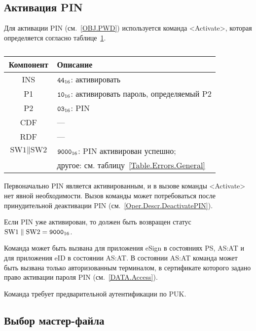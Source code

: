 \subsection{Активация PIN}\label{Oper.Descr.ActivatePIN}

Для активации PIN (см.~\ref{OBJ.PWD})  используется
команда <Activate>, которая определяется согласно 
таблице~\ref{Table.Oper.ActivatePINCmd}.

\begin{table}[hbt]
\caption{}\label{Table.Oper.ActivatePINCmd}
\begin{tabular}{|c|p{14cm}|}
\hline
Компонент & Описание\\
\hline
\hline
INS & $\texttt{44}_{16}$: активировать\\
\hline
P1 & $\texttt{10}_{16}$: активировать пароль, определяемый P2\\
\hline
P2 & $\texttt{03}_{16}$: PIN \\
\hline
CDF &  ---  \\
\hline 
RDF &  --- \\
\hline
$\text{SW1} \parallel \text{SW2}$ & 
  $\texttt{9000}_{16}$:  PIN активирован успешно;\\
  & другое: см. таблицу~\ref{Table.Errors.General}\\
\hline
\end{tabular}
\end{table}

Первоначально PIN является активированным, и в вызове команды <Activate> 
нет явной необходимости. Вызов команды может потребоваться после 
принудительной деактивации PIN (см.~\ref{Oper.Descr.DeactivatePIN}). 

Если PIN уже активирован, то должен быть возвращен 
статус $\text{SW1} \parallel \text{SW2} = \texttt{9000}_{16}$.

Команда может быть вызвана для приложения eSign 
в состояниях PS, AS:AT и для приложения eID в состоянии AS:AT. 
В состоянии AS:AT команда может быть вызвана 
только авторизованным терминалом, в сертификате которого задано 
право активации пароля PIN (см.~\ref{DATA.Access}).

Команда требует предварительной аутентификации по PUK.


\subsection{Выбор мастер-файла}
\label{Oper.Descr.SelectMF}

